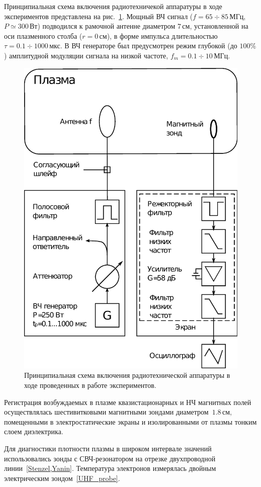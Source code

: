 \documentclass[autoref,10pt]{disser}
\begin{document}
Принципиальная схема включения радиотехничекой аппаратуры в ходе  экспериментов представлена на \mbox{рис.~\ref{fig:scheme_setup}}. Мощный ВЧ сигнал ($f=65\div{}85$\,МГц, $P\simeq300$\,Вт) подводился к рамочной антенне диаметром $7$\,см, установленной на оси плазменного столба ($r=0$\,см), в форме импульса длительностью $\tau=0.1\div1000$\,мкс. В ВЧ генераторе был предусмотрен режим глубокой (до $100\%$) амплитудной модуляции сигнала на низкой частоте, $f_m=0.1\div{}10$\,МГц. 
\begin{figure}[H]
    \centering
    \includegraphics*[width=0.7\columnwidth]{pics/scheme_setup.eps}
    \caption{Принципиальная схема включения радиотехнической аппаратуры в ходе проведенных в работе экспериментов.}
    \label{fig:scheme_setup}
 \end{figure}


Регистрация возбуждаемых в плазме квазистационарных и НЧ магнитных полей осуществлялась шестивитковыми магнитными зондами диаметром~$1.8$\,см, помещенными в электростатические экраны и изолированными от плазмы тонким слоем диэлектрика. 

Для диагностики плотности плазмы в широком интервале значений использовались зонды с СВЧ-резонатором на отрезке двухпроводной линии~\ref{Stenzel,Yanin}. Температура электронов измерялась двойным электрическим зондом~\ref{UHF_probe}. 
\end{document}
